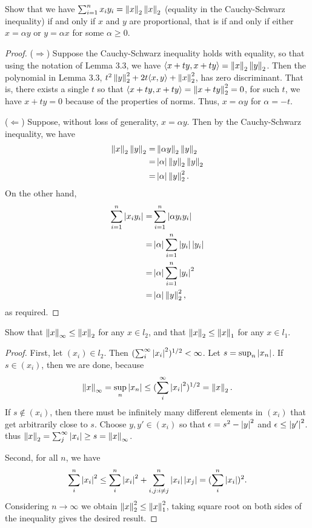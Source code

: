\begin{exercise}{19}
Show that we have $\sum_{i=1}^nx_iy_i=\left\lVert x\right\rVert_2\left\lVert x\right\rVert_2$ (equality in the Cauchy-Schwarz inequality) if and only if $x$ and $y$ are proportional, that is if and only if either $x=\alpha y$ or $y=\alpha x$ for some $\alpha\geq 0$.
\end{exercise}
\begin{proof}
($\Rightarrow$) Suppose the Cauchy-Schwarz inequality holds with equality, so that using the notation of Lemma 3.3, we have $\langle x+ty,x+ty\rangle=\left\lVert x\right\rVert_2\left\lVert y\right\rVert_2$. Then the polynomial in Lemma 3.3, $t^2\left\lVert y\right\rVert_2^2+2t\langle x,y\rangle+\left\lVert x\right\rVert_2^2$, has zero discriminant. That is, there exists a single $t$ so that $\langle x+ty,x+ty\rangle=\left\lVert x+ty\right\rVert_2^2=0$, for such $t$, we have $x+ty=0$ because of the properties of norms. Thus, $x=\alpha y$ for $\alpha =-t$.

($\Leftarrow$) Suppose, without loss of generality, $x=\alpha y$. Then by the Cauchy-Schwarz inequality, we have 
\begin{align*}
    \left\lVert x\right\rVert_2\left\lVert y\right\rVert_2
    =& \left\lVert \alpha y\right\rVert_2\left\lVert y\right\rVert_2\\
    =& \left\lvert \alpha\right\rvert\left\lVert y\right\rVert_2\left\lVert y\right\rVert_2\\
    =& \left\lvert \alpha\right\rvert\left\lVert y\right\rVert_2^2.
\end{align*}
On the other hand,
\begin{align*}
    \sum^n_{i=1}\left\lvert x_iy_i\right\rvert 
    =& \sum^n_{i=1}\left\lvert \alpha y_iy_i\right\rvert\\
    =& \left\lvert \alpha\right\rvert\sum^n_{i=1}\left\lvert  y_i\right\rvert\left\lvert y_i\right\rvert\\
    =& \left\lvert \alpha\right\rvert\sum^n_{i=1}\left\lvert y_i\right\rvert^2\\
    =& \left\lvert \alpha\right\rvert\left\lVert y\right\rVert_2^2,
\end{align*}
as required.
\end{proof} 

\begin{exercise}{22}
Show that $\left\lVert x\right\rVert_\infty \leq\left\lVert x\right\rVert_2$ for any $x\in l_2$, and that $\left\lVert x\right\rVert_2 \leq\left\lVert x\right\rVert_1$ for any $x\in l_1$.
\end{exercise}
\begin{proof}
First, let $(x_i)\in l_2$. Then $(\sum_i^\infty \left\lvert x_i\right\rvert^2)^{1/2} <\infty$. Let $s=\sup_{n}\left\lvert x_n\right\rvert$. If $s\in (x_i)$, then we are done, because 
\[
\left\lVert x\right\rVert_\infty 
=\sup_{n}\left\lvert x_n\right\rvert \leq(\sum_i^\infty\left\lvert x_i\right\rvert^2)^{1/2} 
=\left\lVert x\right\rVert_2.
\]
If $s\notin (x_i)$, then there must be infinitely many different elements in $(x_i)$ that get arbitrarily close to $s$. Choose $y,y'\in (x_i)$ so that $\epsilon =s^2-\left\lvert y\right\rvert^2$ and $\epsilon\leq \left\lvert y'\right\rvert^2$. thus $\left\lVert x\right\rVert_2 =\sum_j^\infty\left\lvert x_i\right\rvert \geq s =\left\lVert x\right\rVert_\infty$.

Second, for all $n$, we have
\[
\sum_i^n\left\lvert x_i\right\rvert^2 
\leq \sum_i^n\left\lvert x_i\right\rvert^2 +\sum_{i,j:i\neq j}^n\left\lvert x_i\right\rvert\left\lvert x_j\right\rvert
= (\sum_i^n\left\lvert x_i\right\rvert)^2.
\]
Considering $n\to\infty$ we obtain $\left\lVert x\right\rVert_2^2\leq \left\lVert x\right\rVert_1^2$, taking square root on both sides of the inequality gives the desired result.
\end{proof} 

